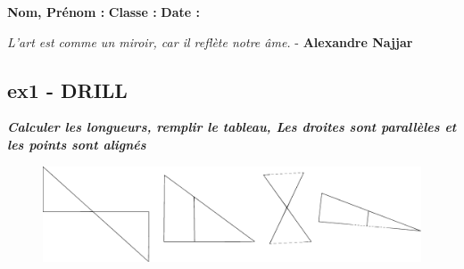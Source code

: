 \documentclass[12pt]{article}
\begin{document}

\newtheorem{Definition}{Définition}
\newtheorem{Theorem}{Théorème}
\newtheorem{Proposition}{Propriété}

\renewcommand{\labelitemi}{$\bullet$}
\renewcommand{\labelitemii}{$\circ$}
\newcommand{\Pointilles}[1][3]{%
  \multido{}{#1}{\makebox[\linewidth]{\dotfill}\\[\parskip]
}}


\setlength{\columnseprule}{1pt}

\textbf{Nom, Prénom :} \hspace{8cm} \textbf{Classe :} \hspace{3cm} \textbf{Date :}\\
\vspace{-0.2cm}
\begin{center}
  \textit{L'art est comme un miroir, car il reflète notre âme.}  - \textbf{Alexandre Najjar}
\end{center}
\vspace{-0.2cm}


\subsection*{ex1 - DRILL}
\textbf{\textit{Calculer les longueurs, remplir le tableau, Les droites sont parallèles et les points sont alignés}}


\begin{figure}[H]
  \centering
  \includegraphics[width=0.9\linewidth]{3x5-thales/thales-ie.eps}
\end{figure}
\end{document}
